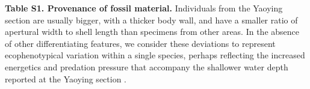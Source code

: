 \documentclass[openany]{book}
\theoremstyle{definition}
\theoremstyle{definition}
\theoremstyle{definition}
\theoremstyle{remark}
\begin{document}
\textbf{Table S1. Provenance of fossil material.} Individuals from the
Yaoying section are usually bigger, with a thicker body wall, and have a
smaller ratio of apertural width to shell length than specimens from
other areas. In the absence of other differentiating features, we
consider these deviations to represent ecophenotypical variation within
a single species, perhaps reflecting the increased energetics and
predation pressure that accompany the shallower water depth reported at
the Yaoying section \citep{Zhao2012}.

\clearpage


\end{document}

